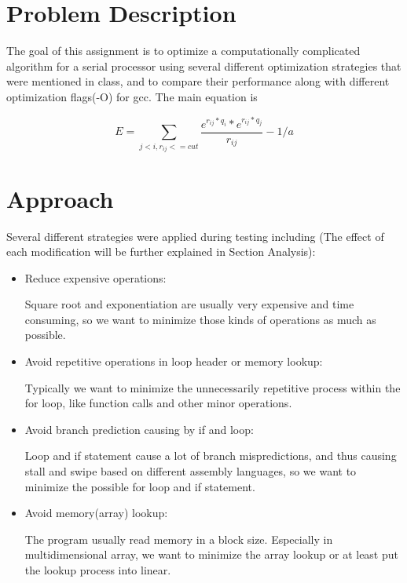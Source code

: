 \documentclass{cs4444}
\begin{document}
\maketitle

\section{Problem Description}
The goal of this assignment is to optimize a computationally complicated algorithm for a serial processor using several different optimization strategies that were mentioned in class, and to compare their performance along with different optimization flags(-O) for gcc. The main equation is 
	
	\[E = \sum_{j<i, r_{ij} <= cut}\frac{e^{r_{ij} * q_i}*e^{r_{ij}*q_j}}{r_{ij}} - 1/a\] 

\section{Approach}
Several different strategies were applied during testing including (The effect of each modification will be further explained in Section Analysis): 

\begin{itemize}
	\item Reduce expensive operations:

		Square root and exponentiation are usually very expensive and time consuming, so we want to minimize those kinds of operations as much as possible.
		
	\item Avoid repetitive operations in loop header or memory lookup:
	 
		Typically we want to minimize the unnecessarily repetitive process within the for loop, like function calls and other minor operations. 
 
	\item Avoid branch prediction causing by if and loop:
		
		Loop and if statement cause a lot of branch mispredictions, and thus causing stall and swipe based on different assembly languages, so we  want to minimize the possible for loop and if statement.
	
	\item Avoid memory(array) lookup:
		
		The program usually read memory in a block size. Especially in multidimensional array, we want to minimize the array lookup or at least put the lookup process into linear. 
	
\end{itemize}
\end{document}
